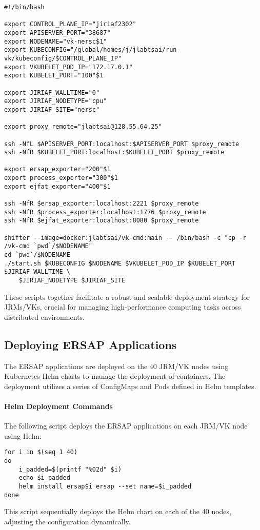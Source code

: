 \begin{verbatim}
#!/bin/bash

export CONTROL_PLANE_IP="jiriaf2302"
export APISERVER_PORT="38687"
export NODENAME="vk-nersc$1"
export KUBECONFIG="/global/homes/j/jlabtsai/run-vk/kubeconfig/$CONTROL_PLANE_IP"
export VKUBELET_POD_IP="172.17.0.1"
export KUBELET_PORT="100"$1

export JIRIAF_WALLTIME="0"
export JIRIAF_NODETYPE="cpu"
export JIRIAF_SITE="nersc"

export proxy_remote="jlabtsai@128.55.64.25"

ssh -NfL $APISERVER_PORT:localhost:$APISERVER_PORT $proxy_remote
ssh -NfR $KUBELET_PORT:localhost:$KUBELET_PORT $proxy_remote

export ersap_exporter="200"$1
export process_exporter="300"$1
export ejfat_exporter="400"$1

ssh -NfR $ersap_exporter:localhost:2221 $proxy_remote
ssh -NfR $process_exporter:localhost:1776 $proxy_remote
ssh -NfR $ejfat_exporter:localhost:8080 $proxy_remote

shifter --image=docker:jlabtsai/vk-cmd:main -- /bin/bash -c "cp -r /vk-cmd `pwd`/$NODENAME"
cd `pwd`/$NODENAME
./start.sh $KUBECONFIG $NODENAME $VKUBELET_POD_IP $KUBELET_PORT $JIRIAF_WALLTIME \
    $JIRIAF_NODETYPE $JIRIAF_SITE
\end{verbatim}

These scripts together facilitate a robust and scalable deployment strategy for JRMs/VKs, crucial for managing high-performance computing tasks across distributed environments.

\subsection{Deploying ERSAP Applications}
The ERSAP applications are deployed on the 40 JRM/VK nodes using Kubernetes Helm charts \cite{helm} to manage the deployment of containers. The deployment utilizes a series of ConfigMaps and Pods defined in Helm templates.

\paragraph{Helm Deployment Commands}
The following script deploys the ERSAP applications on each JRM/VK node using Helm:

\begin{verbatim}
for i in $(seq 1 40)
do
    i_padded=$(printf "%02d" $i)
    echo $i_padded
    helm install ersap$i ersap --set name=$i_padded
done
\end{verbatim}

This script sequentially deploys the Helm chart on each of the 40 nodes, adjusting the configuration dynamically.

